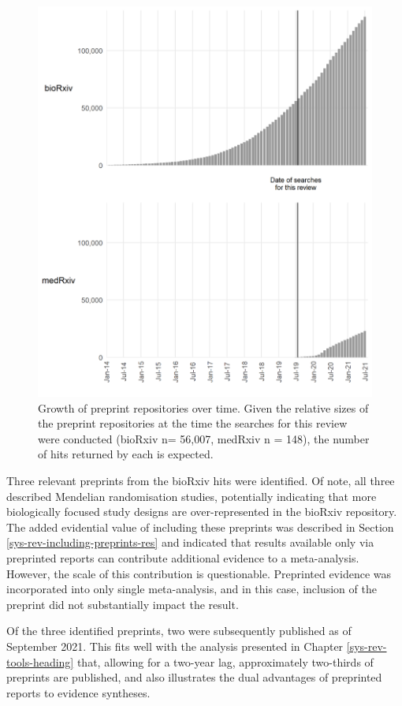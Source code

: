 \documentclass[a4paper, twoside]{templates/ociamthesis}
\begin{document}
\begin{figure}[H]

{\centering \includegraphics[width=0.8\linewidth]{figures/sys-rev/preprint_growth} 

}

\caption[Growth of preprint repositories over time]{Growth of preprint repositories over time. Given the relative sizes of the preprint repositories at the time the searches for this review were conducted (bioRxiv n= 56,007, medRxiv n = 148), the number of hits returned by each is expected.}\label{fig:preprintGrowth}
\end{figure}

Three relevant preprints from the bioRxiv hits were identified. Of note, all three described Mendelian randomisation studies, potentially indicating that more biologically focused study designs are over-represented in the bioRxiv repository. The added evidential value of including these preprints was described in Section \ref{sys-rev-including-preprints-res} and indicated that results available only via preprinted reports can contribute additional evidence to a meta-analysis. However, the scale of this contribution is questionable. Preprinted evidence was incorporated into only single meta-analysis, and in this case, inclusion of the preprint did not substantially impact the result.

Of the three identified preprints, two were subsequently published as of September 2021. This fits well with the analysis presented in Chapter \ref{sys-rev-tools-heading} that, allowing for a two-year lag, approximately two-thirds of preprints are published, and also illustrates the dual advantages of preprinted reports to evidence syntheses.
\end{document}
